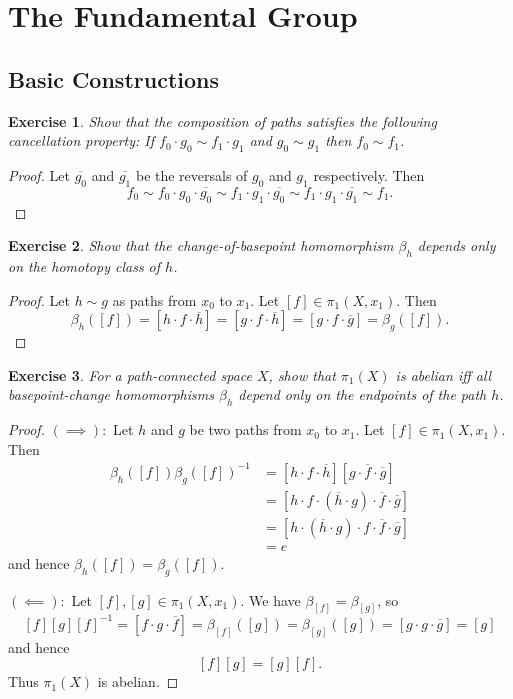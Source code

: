 \documentclass{article}
\newtheorem{exercise}{Exercise}[subsection]
\begin{document}
\section{The Fundamental Group}
\subsection{Basic Constructions}
\begin{exercise}
Show that the composition of paths satisfies the following cancellation property: If $f_0\cdot g_0\sim f_1\cdot g_1$ and $g_0\sim g_1$ then $f_0\sim f_1$.
\end{exercise}
\begin{proof}
Let $\overline{g_0}$ and $\overline{g_1}$ be the reversals of $g_0$ and $g_1$ respectively. Then\[f_0\sim f_0\cdot g_0\cdot\overline{g_0}\sim f_1\cdot g_1\cdot \overline{g_0}\sim f_1\cdot g_1\cdot \overline{g_1}\sim f_1.\]
\end{proof}

\begin{exercise}
Show that the change-of-basepoint homomorphism $\beta_h$ depends only on the homotopy class of $h$.
\end{exercise}
\begin{proof}
Let $h\sim g$ as paths from $x_0$ to $x_1$. Let $[f]\in\pi_1(X,x_1)$. Then \[\beta_h([f])=[h\cdot f\cdot\overline{h}]=[g\cdot f\cdot\overline{h}]=[g\cdot f\cdot\overline{g}]=\beta_g([f]).\]
\end{proof}

\begin{exercise}
For a path-connected space $X$, show that $\pi_1(X)$ is abelian iff all basepoint-change homomorphisms $\beta_h$ depend only on the endpoints of the path $h$.
\end{exercise}
\begin{proof}
$(\implies):$ Let $h$ and $g$ be two paths from $x_0$ to $x_1$. Let $[f]\in\pi_1(X,x_1)$. Then\begin{align*}\beta_h([f])\beta_g([f])^{-1}&=[h\cdot f\cdot\overline{h}][g\cdot\overline{f}\cdot \overline{g}]\\&=[h\cdot f\cdot(\overline{h}\cdot g)\cdot\overline{f}\cdot \overline{g}]\\&=[h\cdot(\overline h\cdot g)\cdot f\cdot \overline{f}\cdot \overline{g}]\\&=e\end{align*}and hence $\beta_h([f])=\beta_g([f])$.

$(\impliedby):$ Let $[f],[g]\in\pi_1(X,x_1)$. We have $\beta_{[f]}=\beta_{[g]}$, so\[[f][g][f]^{-1}=[f\cdot g\cdot \overline{f}]=\beta_{[f]}([g])=\beta_{[g]}([g])=[g\cdot g\cdot \overline{g}]=[g]\] and hence\[[f][g]=[g][f].\] Thus $\pi_1(X)$ is abelian.
\end{proof}
\end{document}

